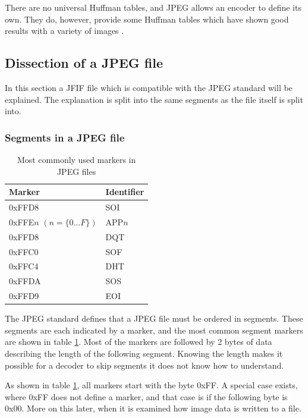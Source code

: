\begin{infobox}
There are no universal Huffman tables, and JPEG allows an encoder to define its own. They do, however, provide some Huffman tables which have shown good results with a variety of images \citep[p. 153]{JPEGStandard}. 

\vspace{4mm}
\subsection*{Dissection of a JPEG file}
\vspace{-2.5mm}
In this section a JFIF file which is compatible with the JPEG standard will be explained. The explanation is split into the same segments as the file itself is split into.
\newpage
\subsubsection*{Segments in a JPEG file}
\begin{table}
\caption{Most commonly used markers in JPEG files}
\label{tab:markers}
\begin{tabular}{|p{2.7cm}|l|}
\hline
Marker & Identifier\\ \hline
0xFFD8 & SOI\\ \hline
0xFFE$n$ \newline$(n = \{0 \ldots F\})$ & APP$n$\\ \hline
0xFFD8 & DQT \\ \hline
0xFFC0 & SOF \\ \hline
0xFFC4 & DHT\\ \hline
0xFFDA & SOS\\ \hline
0xFFD9 & EOI\\ \hline 
\end{tabular}
\end{table}

The JPEG standard defines that a JPEG file must be ordered in segments.
These segments are each indicated by a marker, and the most common segment markers are shown in table \ref{tab:markers}.
Most of the markers are followed by 2 bytes of data describing the length of the following segment.
Knowing the length makes it possible for a decoder to skip segments it does not know how to understand. 

As shown in table \ref{tab:markers}, all markers start with the byte 0xFF.
A special case exists, where 0xFF does not define a marker, and that case is if the following byte is 0x00.
More on this later, when it is examined how image data is written to a file.


\end{infobox}

